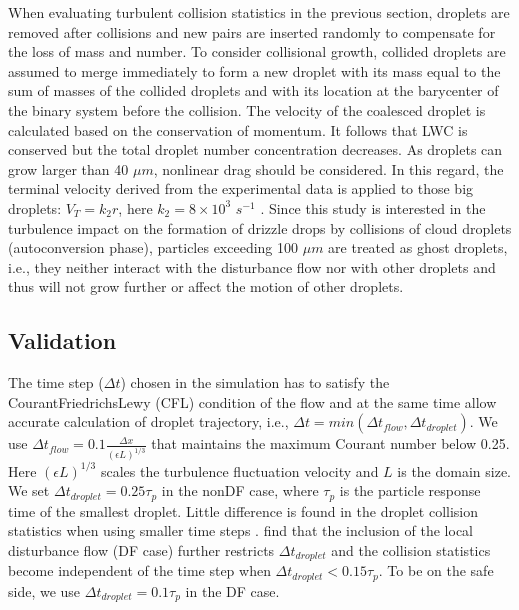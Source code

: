 When evaluating turbulent collision statistics in the previous section, droplets are removed after collisions and new pairs are inserted randomly to compensate for the loss of mass and number. To consider collisional growth, collided droplets are assumed to merge immediately to form a new droplet with its mass equal to the sum of masses of the collided droplets and with its location at the barycenter of the binary system before the collision. The velocity of the coalesced droplet is calculated based on the conservation of momentum. It follows that LWC is conserved but the total droplet number concentration decreases.  As droplets can grow larger than 40 $\mu m$, nonlinear drag should be considered. In this regard, the terminal velocity derived from the experimental data is applied to those big droplets: $V_T=k_2 r$, here $k_2=8\times 10^3$ $s^{-1}$ \citep[p.126]{Rogers1989}. Since this study is interested in the turbulence impact on the formation of drizzle drops by collisions of cloud droplets (autoconversion phase), particles exceeding 100 $\mu m$ are treated as ghost droplets, i.e., they neither interact with the disturbance flow nor with other droplets and thus will not grow further or affect the motion of other droplets. 


\subsection{Validation} \label{sec:ch3_vali}

The time step ($\Delta t$) chosen in the simulation has to satisfy the Courant\textendash Friedrichs\textendash Lewy (CFL) condition of the flow and at the same time allow accurate calculation of droplet trajectory, i.e., $\Delta t = min(\Delta t_{flow}, \Delta t_{droplet})$. We use $\Delta t_{flow}=0.1\frac{\Delta x}{(\epsilon L)^{1/3}}$ that maintains the maximum Courant number below  0.25. Here $(\epsilon L)^{1/3}$ scales the turbulence fluctuation velocity and $L$ is the domain size. We set $\Delta t_{droplet} = 0.25\tau_p$ in the nonDF case, where $\tau_p$ is the particle response time of the smallest droplet. Little difference is found in the droplet collision statistics when using smaller time steps \citep{Vaillancourt2001}. \citet{Ayala2007} find that the inclusion of the local disturbance flow (DF case) further restricts $\Delta t_{droplet}$ and the collision statistics become independent of the time step when $\Delta t_{droplet} < 0.15 \tau_p$. To be on the safe side, we use $\Delta t_{droplet} = 0.1 \tau_p$ in the DF case.

